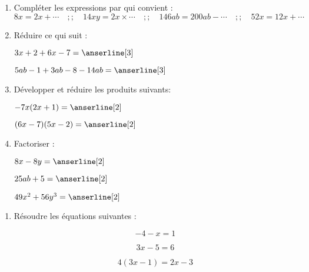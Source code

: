 \documentclass[a4paper,12pt]{article}
\begin{document}
\devoir[sem=2,prv=true,ds=true,num=4 ,niv=1 ,date=02/03/2023]

\begin{exo}[0.75]

\begin{enumerate}


\item Compléter les expressions par qui convient :
\[
 8x = 2x + \cdots\quad ;; \quad
 14xy = 2x \times \cdots\quad ;; \quad
 146 ab = 200 ab - \cdots\quad ;; \quad
 52 x = 12 x + \cdots
\]

\item Réduire ce qui suit :
\begin{multicols}{2}
\(
3x+2+6x-7=\anserline[3]
\)
\columnbreak

\(
5ab-1+3ab-8-14ab=\anserline[3]
\)
\end{multicols}
\vspace{-1cm}
\item Développer et réduire les produits suivants:
\begin{multicols}{2}
\(
-7x(2x+1)=\anserline[2]
\)
\columnbreak

\(
(6x-7)(5x-2)=\anserline[2]
\)
\end{multicols}
\vspace{-1cm}
\item Factoriser :
\begin{multicols}{3}
\(
8x-8y=\anserline[2]
\)
\columnbreak

\(
25ab+5=\anserline[2]
\)
\columnbreak

\(
49x^{2}+56y^{3}=\anserline[2]
\)
\end{multicols}
\end{enumerate}

\end{exo}

\begin{exo}
\begin{enumerate}

\item Résoudre les équations suivantes :
\begin{multicols}{3}
 \[-4-x=1\]
\anserline[4]
\columnbreak

 \[3x-5=6\]
\anserline[4]
\columnbreak

 \[4(3x-1)=2x-3\]
\anserline[4]
\end{multicols}

\end{enumerate}
\end{exo}
\end{document}
